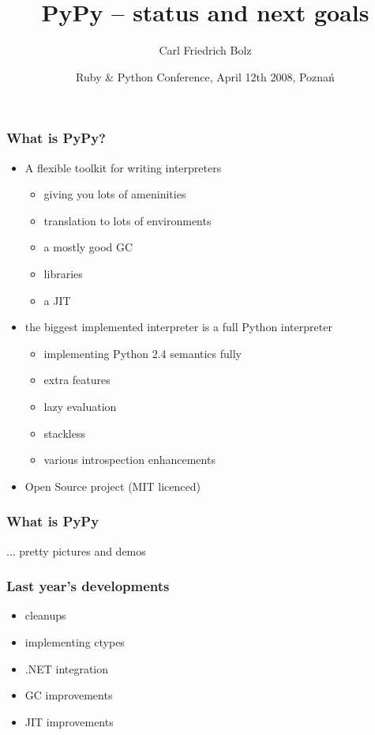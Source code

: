 \documentclass[utf8x]{beamer}
\title{PyPy – status and next goals}
\author{Carl Friedrich Bolz}
\institute[Heinrich-Heine-Universität Düsseldorf]
{
  Institut für Informatik\\
  Heinrich-Heine-Universität Düsseldorf
}
\date{Ruby \& Python Conference, April 12th 2008, Poznań}
\begin{document}
\begin{frame}
  \titlepage
\end{frame}


\begin{frame}
  \frametitle{What is PyPy?}
  \begin{itemize}
  \item
    A flexible toolkit for writing interpreters
    \begin{itemize}
      \item
        giving you lots of ameninities
      \item
        translation to lots of environments
      \item
        a mostly good GC
      \item
        libraries
      \item
        a JIT
    \end{itemize}
  \pause
  \item
    the biggest implemented interpreter is a full Python interpreter
    \begin{itemize}
      \item
        implementing Python 2.4 semantics fully
      \item
        extra features
      \item
        lazy evaluation
      \item
        stackless
      \item
        various introspection enhancements
    \end{itemize}
  \item
    Open Source project (MIT licenced)
  \end{itemize}
\end{frame}


\begin{frame}
  \frametitle{What is PyPy}
  ... pretty pictures and demos
\end{frame}




\begin{frame}
  \frametitle{Last year's developments}
  \begin{itemize}
  \item
    cleanups
  \item
    implementing ctypes
  \item
    .NET integration
  \item
    GC improvements
  \item
    JIT improvements
  \end{itemize}
\end{frame}
\end{document}
